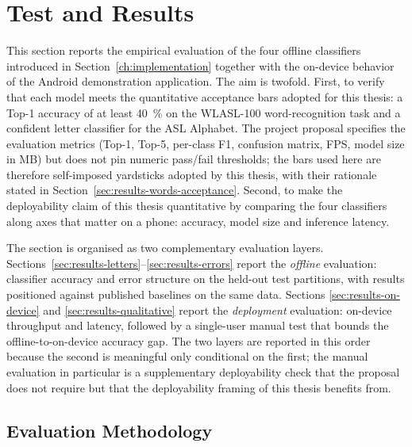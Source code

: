 \chapter{Test and Results}
\label{ch:test-results}

This section reports the empirical evaluation of the four offline
classifiers introduced in Section~\ref{ch:implementation} together
with the on-device behavior of the Android demonstration application.
The aim is twofold. First, to verify that each model meets the
quantitative acceptance bars adopted for this thesis: a Top-1
accuracy of at least \SI{40}{\percent} on the WLASL-100
word-recognition task and a confident letter classifier for the ASL
Alphabet. The project proposal specifies the evaluation metrics
(Top-1, Top-5, per-class F1, confusion matrix, FPS, model size in
MB) but does not pin numeric pass/fail thresholds; the bars used here
are therefore self-imposed yardsticks adopted by this thesis, with
their rationale stated in
Section~\ref{sec:results-words-acceptance}. Second, to make the
deployability claim of this thesis quantitative by comparing the four
classifiers along axes that matter on a phone: accuracy, model size
and inference latency.

The section is organised as two complementary evaluation layers.
Sections~\ref{sec:results-letters}--\ref{sec:results-errors} report
the \emph{offline} evaluation: classifier accuracy and error
structure on the held-out test partitions, with results positioned
against published baselines on the same data. Sections
\ref{sec:results-on-device} and \ref{sec:results-qualitative} report
the \emph{deployment} evaluation: on-device throughput and latency,
followed by a single-user manual test that bounds the
offline-to-on-device accuracy gap. The two layers are reported in
this order because the second is meaningful only conditional on the
first; the manual evaluation in particular is a supplementary
deployability check that the proposal does not require but that the
deployability framing of this thesis benefits from.

\section{Evaluation Methodology}
\label{sec:results-methodology}

